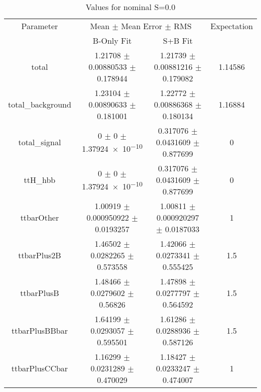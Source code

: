 \begin{table}
\centering
\caption{Values for nominal S=0.0}
\begin{tabular}{cccc}
\toprule
Parameter & \multicolumn{2}{c}{Mean $\pm$ Mean Error $\pm$ RMS} & Expectation\\
 & B-Only Fit & S+B Fit & \\
\midrule
total & \num{1.21708} $\pm$ \num{0.00880533} $\pm$ \num{0.178944} & \num{1.21739} $\pm$ \num{0.00881216} $\pm$ \num{0.179082} & \num{1.14586}\\
total\_background & \num{1.23104} $\pm$ \num{0.00890633} $\pm$ \num{0.181001} & \num{1.22772} $\pm$ \num{0.00886368} $\pm$ \num{0.180134} & \num{1.16884}\\
total\_signal & \num{0} $\pm$ \num{0} $\pm$ \num{1.37924e-10} & \num{0.317076} $\pm$ \num{0.0431609} $\pm$ \num{0.877699} & \num{0}\\
ttH\_hbb & \num{0} $\pm$ \num{0} $\pm$ \num{1.37924e-10} & \num{0.317076} $\pm$ \num{0.0431609} $\pm$ \num{0.877699} & \num{0}\\
ttbarOther & \num{1.00919} $\pm$ \num{0.000950922} $\pm$ \num{0.0193257} & \num{1.00811} $\pm$ \num{0.000920297} $\pm$ \num{0.0187033} & \num{1}\\
ttbarPlus2B & \num{1.46502} $\pm$ \num{0.0282265} $\pm$ \num{0.573558} & \num{1.42066} $\pm$ \num{0.0273341} $\pm$ \num{0.555425} & \num{1.5}\\
ttbarPlusB & \num{1.48466} $\pm$ \num{0.0279602} $\pm$ \num{0.56826} & \num{1.47898} $\pm$ \num{0.0277797} $\pm$ \num{0.564592} & \num{1.5}\\
ttbarPlusBBbar & \num{1.64199} $\pm$ \num{0.0293057} $\pm$ \num{0.595501} & \num{1.61286} $\pm$ \num{0.0288936} $\pm$ \num{0.587126} & \num{1.5}\\
ttbarPlusCCbar & \num{1.16299} $\pm$ \num{0.0231289} $\pm$ \num{0.470029} & \num{1.18427} $\pm$ \num{0.0233247} $\pm$ \num{0.474007} & \num{1}\\
\bottomrule
\end{tabular}
\end{table}